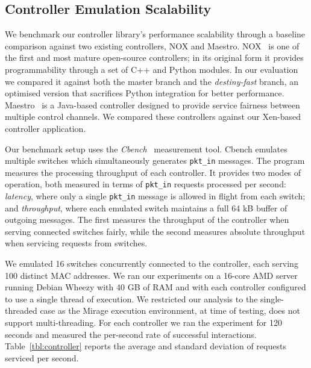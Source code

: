 \subsection{Controller Emulation Scalability} \label{sec:of-controller-perf}

We benchmark our controller library's performance scalability through a
baseline comparison against two existing \of controllers, NOX and Maestro.
NOX~ is one of the first and most mature open-source \of
controllers; in its original form it provides programmability through a set of
C++ and Python modules.  In our evaluation we compared it against both the
master branch and the {\it destiny-fast} \/branch, an optimised version that
sacrifices Python integration for better performance.  Maestro~
is a Java-based controller designed to provide service fairness between
multiple \of control channels.  We compared these controllers against our
Xen-based \mirage \of controller application.

Our benchmark setup uses the {\it Cbench}~ measurement tool.
Cbench emulates multiple switches which simultaneously generates {\tt pkt\_in}
messages.  The program measures the processing throughput of each controller.
It provides two modes of operation, both measured in terms of {\tt pkt\_in}
requests processed per second: {\it latency}, where only a single {\tt pkt\_in}
message is allowed in flight from each switch; and {\it throughput}, where each
emulated switch maintains a full 64 kB buffer of outgoing messages. The first
measures the throughput of the controller when serving connected switches
fairly, while the second measures absolute throughput when servicing requests
from switches.

We emulated 16 switches concurrently connected to the controller, each serving
100 distinct MAC addresses. We ran our experiments on a 16-core AMD server
running Debian Wheezy with 40 GB of RAM and with each controller configured to use a
single thread of execution. We restricted our analysis to the single-threaded case
as the Mirage execution environment, at time of testing, does not support
multi-threading. For each controller we ran the experiment for 120 seconds and
measured the per-second rate of successful interactions.
Table~\ref{tbl:controller} reports the average and standard deviation of
requests serviced per second.

